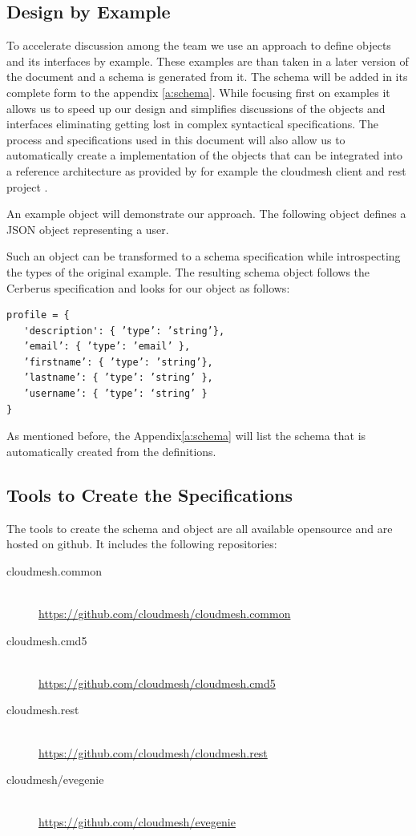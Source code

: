 \documentclass[10pt]{article}
\begin{document}

\subsection{Design by Example}

To accelerate discussion among the team we use an approach to define
objects and its interfaces by example. These examples are than taken
in a later version of the document and a schema is generated from
it. The schema will be added in its complete form to the appendix
\ref{a:schema}. While focusing first on examples it allows us to speed
up our design and simplifies discussions of the objects and interfaces
eliminating getting lost in complex syntactical specifications. The
process and specifications used in this document will also allow us to
automatically create a implementation of the objects that can be
integrated into a reference architecture as provided by for example
the cloudmesh client and rest project \cite{www-cloudmesh-client}.

An example object will demonstrate our approach. The following object
defines a JSON object representing a user. 



 
Such an object can be transformed to a schema specification 
while introspecting the types of the original example. The resulting
schema object follows the Cerberus \cite{www-cerberus} specification and looks
for our object as follows:

\begin{Verbatim}
profile = {  
   'description': { ’type’: ’string’},  
   ’email’: { ’type’: ’email’ },  
   ’firstname’: { ’type’: ’string’},  
   ’lastname’: { ’type’: ’string’ },   
   ’username’: { ’type’: ‘string’ } 
}  
\end{Verbatim}

As mentioned before, the Appendix\ref{a:schema} will list the schema
that is automatically created from the definitions.

\subsection{Tools to Create the Specifications}

The tools to create the schema and object are all available opensource
and are hosted on github. It includes the following repositories:

\begin{description}
\item[cloudmesh.common] ~\\
  \url{https://github.com/cloudmesh/cloudmesh.common}
\item[cloudmesh.cmd5] ~\\
  \url{https://github.com/cloudmesh/cloudmesh.cmd5}
\item[cloudmesh.rest] ~\\
  \url{https://github.com/cloudmesh/cloudmesh.rest}
\item[cloudmesh/evegenie] ~\\
  \url{https://github.com/cloudmesh/evegenie}
\end{description}
\end{document}
